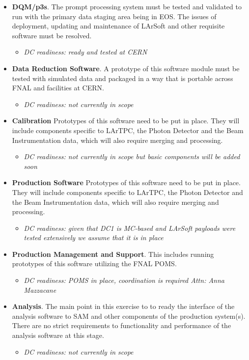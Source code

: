 \documentclass[pdftex,12pt,letter]{article}
\begin{document}
\begin{itemize}
\item  \textbf{DQM/p3s}. The prompt processing system must be tested and validated to run with the primary data
staging area being in EOS. The issues of deployment, updating and maintenance of LArSoft and other requisite software
must be resolved.
\begin{itemize}
\item \emph{DC readiness: ready and tested at CERN}
\end{itemize}


\item  \textbf{Data Reduction Software}.
A prototype of this software module must be tested with simulated data and packaged in a way that is portable across
FNAL and facilities at CERN.
\begin{itemize}
\item \emph{DC readiness: not currently in scope}
\end{itemize}

\item  \textbf{Calibration}
Prototypes of this software need to be put in place. They will
include components specific to LArTPC, the Photon Detector and the Beam Instrumentation data, which will also require
merging and processing.

\begin{itemize}
\item \emph{DC readiness: not currently in scope but basic components will be added soon}
\end{itemize}


\item \textbf{Production Software} Prototypes of this software need to be put in place. They will
include components specific to LArTPC, the Photon Detector and the Beam Instrumentation data, which will also require
merging and processing.

\begin{itemize}
\item \emph{DC readiness: given that DC1 is MC-based and LArSoft payloads were tested extensively we assume that it is in place}
\end{itemize}

\item  \textbf{Production Management and Support}. This includes running prototypes of this software utilizing the FNAL POMS.
\begin{itemize}
\item \emph{DC readiness: POMS in place, coordination is required Attn: Anna Mazzacane}
\end{itemize}


\item  \textbf{Analysis}. The main point in this exercise to to ready the interface of the analysis software to SAM and other
components of the production system(s). There are no strict requirements to functionality and performance of the analysis
software at this stage.

\begin{itemize}
\item \emph{DC readiness: not currently in scope}
\end{itemize}

\end{itemize}
\end{document}
